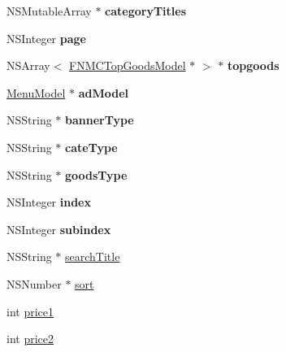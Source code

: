 \begin{DoxyCompactItemize}
N\+S\+Mutable\+Array $\ast$ {\bfseries category\+Titles}
\item 
\mbox{\label{category_f_n_m_coupon_purchase_controller_07_08_a5298ce0d17db5d7b1bd3aed073f76822}} 
N\+S\+Integer {\bfseries page}
\item 
\mbox{\label{category_f_n_m_coupon_purchase_controller_07_08_a1017e8c5ee8ff1f34058b18f47e63832}} 
N\+S\+Array$<$ \mbox{\hyperlink{interface_f_n_m_c_top_goods_model}{F\+N\+M\+C\+Top\+Goods\+Model}} $\ast$ $>$ $\ast$ {\bfseries topgoods}
\item 
\mbox{\label{category_f_n_m_coupon_purchase_controller_07_08_a366dfa1c848a2d8cecf93b95c18976d6}} 
\mbox{\hyperlink{interface_menu_model}{Menu\+Model}} $\ast$ {\bfseries ad\+Model}
\item 
\mbox{\label{category_f_n_m_coupon_purchase_controller_07_08_ab8ee29ad850eb1d51f9efa4c6dc1c542}} 
N\+S\+String $\ast$ {\bfseries banner\+Type}
\item 
\mbox{\label{category_f_n_m_coupon_purchase_controller_07_08_ab1eaacc95736b750a49441f947425c75}} 
N\+S\+String $\ast$ {\bfseries cate\+Type}
\item 
\mbox{\label{category_f_n_m_coupon_purchase_controller_07_08_a1d6bf38d2addb20cdd86836014569eda}} 
N\+S\+String $\ast$ {\bfseries goods\+Type}
\item 
\mbox{\label{category_f_n_m_coupon_purchase_controller_07_08_ad7f1a0c69df2bc03d8206bdf4b2930ea}} 
N\+S\+Integer {\bfseries index}
\item 
\mbox{\label{category_f_n_m_coupon_purchase_controller_07_08_a508eb0d0b51ca3674de92026d73625ee}} 
N\+S\+Integer {\bfseries subindex}
\item 
N\+S\+String $\ast$ \mbox{\hyperlink{category_f_n_m_coupon_purchase_controller_07_08_a03d67507ce0a4a850e3be020ddcad05f}{search\+Title}}
\item 
N\+S\+Number $\ast$ \mbox{\hyperlink{category_f_n_m_coupon_purchase_controller_07_08_a6b144ad0b1b9da79bbb739f538bceeb7}{sort}}
\item 
int \mbox{\hyperlink{category_f_n_m_coupon_purchase_controller_07_08_a320722a2b57dac2fd6aba4086aefb5f0}{price1}}
\item 
int \mbox{\hyperlink{category_f_n_m_coupon_purchase_controller_07_08_a43e859e55880e33d8e32e6fd1ed903a5}{price2}}
\end{DoxyCompactItemize}


